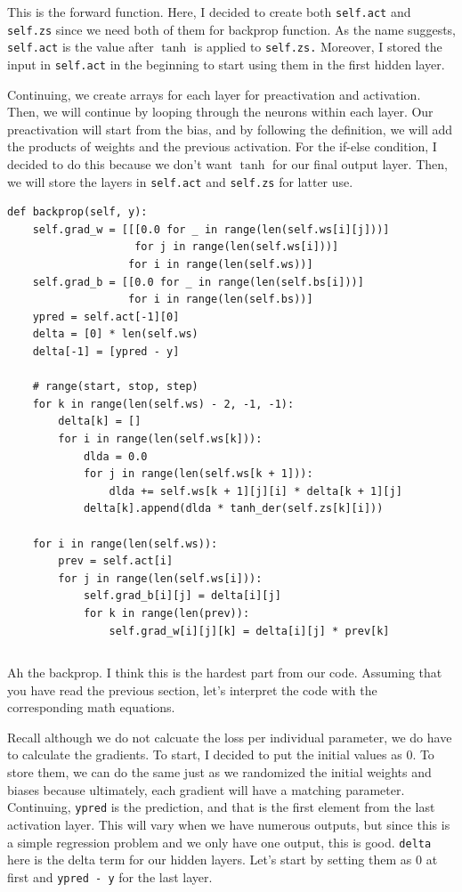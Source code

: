 \documentclass[../../main.tex]{subfiles}
\begin{document}
This is the forward function. Here, I decided to create both
\verb|self.act| and \verb|self.zs| since we need both of them
for backprop function. As the name suggests, \verb|self.act| is the
value after $\tanh$ is applied to \verb|self.zs.| Moreover, I stored
the input in \verb|self.act| in the beginning to start using them in
the first hidden layer.

Continuing, we create arrays for each layer for preactivation
and activation. Then, we will continue by looping through the
neurons within each layer. Our preactivation will start from
the bias, and by following the definition, we will add the products
of weights and the previous activation. For the if-else condition,
I decided to do this because we don't want $\tanh$ for our final
output layer. Then, we will store the layers in \verb|self.act| and
\verb|self.zs| for latter use.

\begin{jupyter}
\begin{lstlisting}[style=jin]
def backprop(self, y):
    self.grad_w = [[[0.0 for _ in range(len(self.ws[i][j]))]
                    for j in range(len(self.ws[i]))]
                   for i in range(len(self.ws))]
    self.grad_b = [[0.0 for _ in range(len(self.bs[i]))]
                   for i in range(len(self.bs))]
    ypred = self.act[-1][0]
    delta = [0] * len(self.ws)
    delta[-1] = [ypred - y]

    # range(start, stop, step)
    for k in range(len(self.ws) - 2, -1, -1):
        delta[k] = []
        for i in range(len(self.ws[k])):
            dlda = 0.0
            for j in range(len(self.ws[k + 1])):
                dlda += self.ws[k + 1][j][i] * delta[k + 1][j]
            delta[k].append(dlda * tanh_der(self.zs[k][i]))

    for i in range(len(self.ws)):
        prev = self.act[i]
        for j in range(len(self.ws[i])):
            self.grad_b[i][j] = delta[i][j]
            for k in range(len(prev)):
                self.grad_w[i][j][k] = delta[i][j] * prev[k]
\end{lstlisting}
\begin{lstlisting}[style=jout]
\end{lstlisting}
\end{jupyter}

Ah the backprop. I think this is the hardest part from our code.
Assuming that you have read the previous section, let's interpret
the code with the corresponding math equations.

Recall although we do not calcuate the loss per individual parameter,
we do have to calculate the gradients. To start, I decided to put
the initial values as $0$. To store them, we can do the same just
as we randomized the initial weights and biases because ultimately,
each gradient will have a matching parameter. Continuing, \verb|ypred|
is the prediction, and that is the first element from the last
activation layer. This will vary when we have numerous outputs,
but since this is a simple regression problem and we only have one
output, this is good. \verb|delta| here is the delta term for our
hidden layers. Let's start by setting them as $0$ at first and
\verb|ypred - y| for the last layer.
\end{document}
